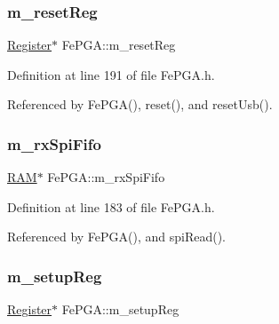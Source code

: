 \mbox{\label{classFePGA_aeff1a2370237a06b50e1ae23d933c862}} 
\subsubsection{\texorpdfstring{m\+\_\+reset\+Reg}{m\_resetReg}}
{\footnotesize\ttfamily \hyperlink{classRegister}{Register}$\ast$ Fe\+P\+G\+A\+::m\+\_\+reset\+Reg\hspace{0.3cm}{\ttfamily [private]}}



Definition at line 191 of file Fe\+P\+G\+A.\+h.



Referenced by Fe\+P\+G\+A(), reset(), and reset\+Usb().

\mbox{\label{classFePGA_a3ee7f973bfad39b48bbc1a185e9ffaec}} 
\subsubsection{\texorpdfstring{m\+\_\+rx\+Spi\+Fifo}{m\_rxSpiFifo}}
{\footnotesize\ttfamily \hyperlink{classRAM}{R\+AM}$\ast$ Fe\+P\+G\+A\+::m\+\_\+rx\+Spi\+Fifo\hspace{0.3cm}{\ttfamily [private]}}



Definition at line 183 of file Fe\+P\+G\+A.\+h.



Referenced by Fe\+P\+G\+A(), and spi\+Read().

\mbox{\label{classFePGA_a0255fe229013986b4387c3a75ddf4e97}} 
\subsubsection{\texorpdfstring{m\+\_\+setup\+Reg}{m\_setupReg}}
{\footnotesize\ttfamily \hyperlink{classRegister}{Register}$\ast$ Fe\+P\+G\+A\+::m\+\_\+setup\+Reg\hspace{0.3cm}{\ttfamily [private]}}




